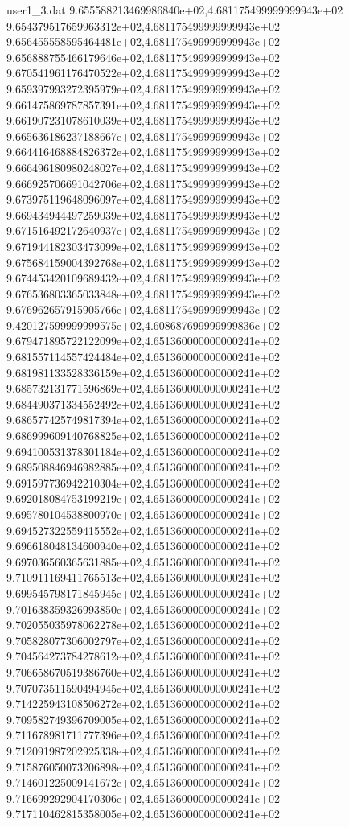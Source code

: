 \begin{filecontents}{user1_3.dat}
9.655588213469986840e+02,4.681175499999999943e+02
9.654379517659963312e+02,4.681175499999999943e+02
9.656455558595464481e+02,4.681175499999999943e+02
9.656888755466179646e+02,4.681175499999999943e+02
9.670541961176470522e+02,4.681175499999999943e+02
9.659397993272395979e+02,4.681175499999999943e+02
9.661475869787857391e+02,4.681175499999999943e+02
9.661907231078610039e+02,4.681175499999999943e+02
9.665636186237188667e+02,4.681175499999999943e+02
9.664416468884826372e+02,4.681175499999999943e+02
9.666496180980248027e+02,4.681175499999999943e+02
9.666925706691042706e+02,4.681175499999999943e+02
9.673975119648096097e+02,4.681175499999999943e+02
9.669434944497259039e+02,4.681175499999999943e+02
9.671516492172640937e+02,4.681175499999999943e+02
9.671944182303473099e+02,4.681175499999999943e+02
9.675684159004392768e+02,4.681175499999999943e+02
9.674453420109689432e+02,4.681175499999999943e+02
9.676536803365033848e+02,4.681175499999999943e+02
9.676962657915905766e+02,4.681175499999999943e+02
9.420127599999999575e+02,4.608687699999999836e+02
9.679471895722122099e+02,4.651360000000000241e+02
9.681557114557424484e+02,4.651360000000000241e+02
9.681981133528336159e+02,4.651360000000000241e+02
9.685732131771596869e+02,4.651360000000000241e+02
9.684490371334552492e+02,4.651360000000000241e+02
9.686577425749817394e+02,4.651360000000000241e+02
9.686999609140768825e+02,4.651360000000000241e+02
9.694100531378301184e+02,4.651360000000000241e+02
9.689508846946982885e+02,4.651360000000000241e+02
9.691597736942210304e+02,4.651360000000000241e+02
9.692018084753199219e+02,4.651360000000000241e+02
9.695780104538800970e+02,4.651360000000000241e+02
9.694527322559415552e+02,4.651360000000000241e+02
9.696618048134600940e+02,4.651360000000000241e+02
9.697036560365631885e+02,4.651360000000000241e+02
9.710911169411765513e+02,4.651360000000000241e+02
9.699545798171845945e+02,4.651360000000000241e+02
9.701638359326993850e+02,4.651360000000000241e+02
9.702055035978062278e+02,4.651360000000000241e+02
9.705828077306002797e+02,4.651360000000000241e+02
9.704564273784278612e+02,4.651360000000000241e+02
9.706658670519386760e+02,4.651360000000000241e+02
9.707073511590494945e+02,4.651360000000000241e+02
9.714225943108506272e+02,4.651360000000000241e+02
9.709582749396709005e+02,4.651360000000000241e+02
9.711678981711777396e+02,4.651360000000000241e+02
9.712091987202925338e+02,4.651360000000000241e+02
9.715876050073206898e+02,4.651360000000000241e+02
9.714601225009141672e+02,4.651360000000000241e+02
9.716699292904170306e+02,4.651360000000000241e+02
9.717110462815358005e+02,4.651360000000000241e+02

\end{filecontents}
